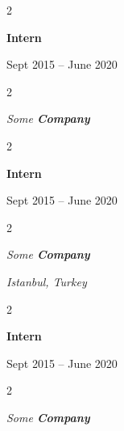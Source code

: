 \documentclass[10pt, letterpaper]{article}
\newenvironment{twocolentry}[2][]{
    \onecolentry
    \def\secondColumn{#2}
    \setcolumnwidth{\fill, 4.5 cm}
    \begin{paracol}{2}
}{
    \switchcolumn \raggedleft \secondColumn
    \end{paracol}
    \endonecolentry
} %
\begin{document}
        \vspace{0.2 cm}

                \begin{twocolentry}{
                    Sept 2015 – June 2020
                }
                \textbf{Intern}
                \end{twocolentry}
            \begin{twocolentry}{
            }
            \textit{Some \textbf{Company}}
            \end{twocolentry}



        \vspace{0.2 cm}

                \begin{twocolentry}{
                    Sept 2015 – June 2020
                }
                \textbf{Intern}
                \end{twocolentry}
            \begin{twocolentry}{
        \textit{Istanbul, Turkey}    }
            \textit{Some \textbf{Company}}
            \end{twocolentry}



        \vspace{0.2 cm}

                \begin{twocolentry}{
                    Sept 2015 – June 2020
                }
                \textbf{Intern}
                \end{twocolentry}
            \begin{twocolentry}{
            }
            \textit{Some \textbf{Company}}
            \end{twocolentry}
\end{document}
